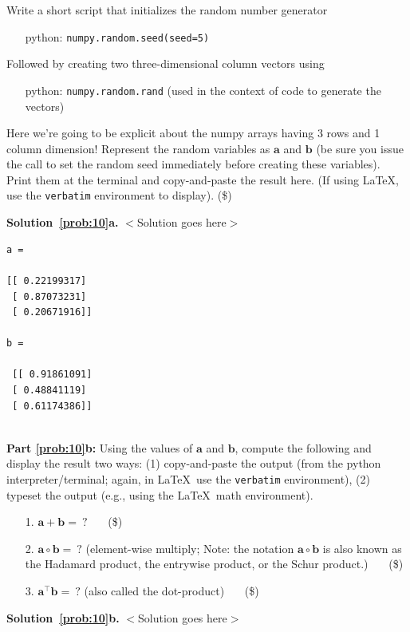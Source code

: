 \documentclass[10pt]{article}
\begin{document}
\begin{enumerate}
Write a short script that initializes the random number generator
\begin{itemize}
\item[] python: {\tt numpy.random.seed(seed=5)}
\end{itemize}
Followed by creating two three-dimensional column vectors using
\begin{itemize}
\item[] python: {\tt numpy.random.rand} (used in the context of code to generate the vectors)
\end{itemize}
Here we're going to be explicit about the numpy arrays having 3 rows and 1 column dimension!
Represent the random variables as $\mathbf{a}$ and $\mathbf{b}$ (be sure you issue the call to set the random seed immediately before creating these variables).  Print them at the terminal and copy-and-paste the result here. (If using \LaTeX, use the {\tt verbatim} environment to display). (\$)

{\bf Solution~\ref{prob:10}a.} $<$Solution goes here$>$\\

\begin{verbatim}
a = 

[[ 0.22199317]
 [ 0.87073231]
 [ 0.20671916]] 

b = 

 [[ 0.91861091]
 [ 0.48841119]
 [ 0.61174386]]
 
\end{verbatim}


{\bf Part \ref{prob:10}b:} Using the values of $\mathbf{a}$ and $\mathbf{b}$, compute the following and display the result two ways: (1) copy-and-paste the output (from the python interpreter/terminal; again, in \LaTeX~use the {\tt verbatim} environment), (2) typeset the output (e.g., using the \LaTeX~math environment).
\begin{enumerate}
\item[1.] $\mathbf{a} + \mathbf{b} = ~?$ ~~~(\$)
\item[2.] $\mathbf{a} \circ \mathbf{b} = ~?$  (element-wise multiply; Note: the notation $\mathbf{a} \circ \mathbf{b}$ is also known as the Hadamard product, the entrywise product, or the Schur product.) ~~~(\$)
\item[3.] $\mathbf{a}^\top \mathbf{b} = ~?$  (also called the dot-product) ~~~(\$)
\end{enumerate}

{\bf Solution~\ref{prob:10}b.} $<$Solution goes here$>$\\


\end{enumerate}
\end{document}
